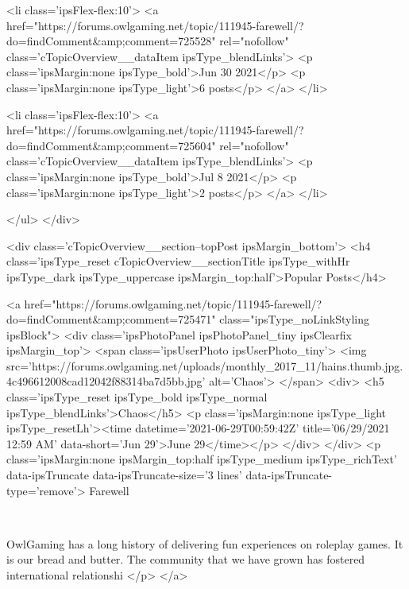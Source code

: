 						<li class='ipsFlex-flex:10'>
							<a href="https://forums.owlgaming.net/topic/111945-farewell/?do=findComment&amp;comment=725528" rel="nofollow" class='cTopicOverview__dataItem ipsType_blendLinks'>
								<p class='ipsMargin:none ipsType_bold'>Jun 30 2021</p>
								<p class='ipsMargin:none ipsType_light'>6 posts</p>
							</a>
						</li>
					
						<li class='ipsFlex-flex:10'>
							<a href="https://forums.owlgaming.net/topic/111945-farewell/?do=findComment&amp;comment=725604" rel="nofollow" class='cTopicOverview__dataItem ipsType_blendLinks'>
								<p class='ipsMargin:none ipsType_bold'>Jul 8 2021</p>
								<p class='ipsMargin:none ipsType_light'>2 posts</p>
							</a>
						</li>
					
				</ul>
			</div>
		
		
			<div class='cTopicOverview__section--topPost ipsMargin_bottom'>
				<h4 class='ipsType_reset cTopicOverview__sectionTitle ipsType_withHr ipsType_dark ipsType_uppercase ipsMargin_top:half'>Popular Posts</h4>
				
					<a href="https://forums.owlgaming.net/topic/111945-farewell/?do=findComment&amp;comment=725471" class="ipsType_noLinkStyling ipsBlock">
						<div class='ipsPhotoPanel ipsPhotoPanel_tiny ipsClearfix ipsMargin_top'>
							<span class='ipsUserPhoto ipsUserPhoto_tiny'>
								<img src='https://forums.owlgaming.net/uploads/monthly_2017_11/hains.thumb.jpg.4c496612008cad12042f88314ba7d5bb.jpg' alt='Chaos'>
							</span>
							<div>
								<h5 class='ipsType_reset ipsType_bold ipsType_normal ipsType_blendLinks'>Chaos</h5>
								<p class='ipsMargin:none ipsType_light ipsType_resetLh'><time datetime='2021-06-29T00:59:42Z' title='06/29/2021 12:59  AM' data-short='Jun 29'>June 29</time></p>
							</div>
						</div>
						<p class='ipsMargin:none ipsMargin_top:half ipsType_medium ipsType_richText' data-ipsTruncate data-ipsTruncate-size='3 lines' data-ipsTruncate-type='remove'>
							Farewell
	 



	 
 


	OwlGaming has a long history of delivering fun experiences on roleplay games. It is our bread and butter. The community that we have grown has fostered international relationshi
						</p>
					</a>
				
